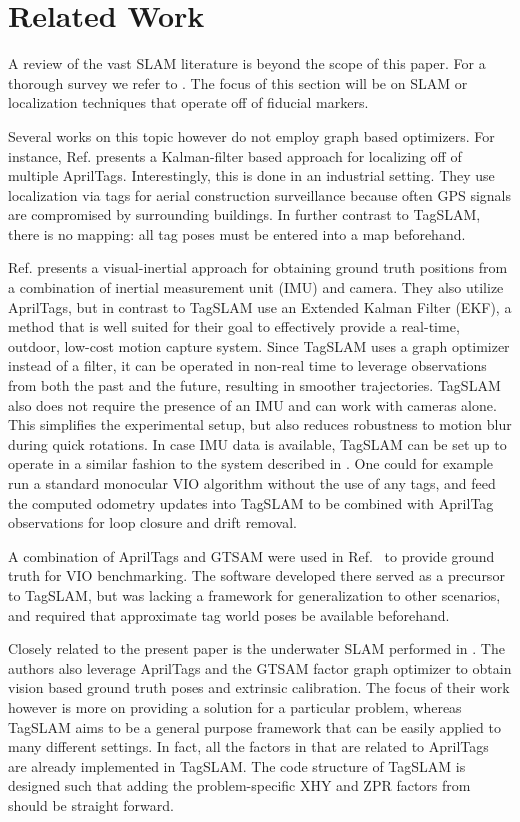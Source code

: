 \section{Related Work}
A review of the vast SLAM literature is beyond the scope of this
paper. For a thorough survey we refer to \cite{cadena2016}. The focus
of this section will be on SLAM or localization techniques that
operate off of fiducial markers.

Several works on this topic however do not employ graph based
optimizers. For instance, Ref. \cite{kayhani2019} presents a
Kalman-filter based approach for localizing off of multiple
AprilTags. Interestingly, this is done in an industrial setting. They
use localization via tags for aerial construction surveillance because
often GPS signals are compromised by surrounding buildings. In further
contrast to TagSLAM, there is no mapping: all tag poses must be
entered into a map beforehand.

Ref. \cite{neunert2016} presents a visual-inertial approach for
obtaining ground truth positions from a combination of inertial
measurement unit (IMU) and camera. They also utilize AprilTags, but in
contrast to TagSLAM use an Extended Kalman Filter (EKF), a method that
is well suited for their goal to effectively provide a real-time,
outdoor, low-cost motion capture system. Since TagSLAM uses a graph
optimizer instead of a filter, it can be operated in non-real time to
leverage observations from both the past and the future, resulting in
smoother trajectories. TagSLAM also does not require the presence of
an IMU and can work with cameras alone. This simplifies the
experimental setup, but also reduces robustness to motion blur during
quick rotations. In case IMU data is available, TagSLAM can be set up
to operate in a similar fashion to the system described in
\cite{neunert2016}. One could for example run a standard monocular VIO
algorithm without the use of any tags, and feed the computed odometry
updates into TagSLAM to be combined with AprilTag observations for
loop closure and drift removal.

A combination of AprilTags and GTSAM were used in
Ref.\ \cite{pfrommer2017} to provide ground truth for VIO
benchmarking. The software developed there served as a precursor to
TagSLAM, but was lacking a framework for generalization to other
scenarios, and required that approximate tag world poses be available
beforehand.

Closely related to the present paper is the underwater SLAM performed
in \cite{westman2018}. The authors also leverage AprilTags and the
GTSAM factor graph optimizer to obtain vision based ground truth poses
and extrinsic calibration. The focus of their work however is more on
providing a solution for a particular problem, whereas TagSLAM aims to
be a general purpose framework that can be easily applied to many
different settings. In fact, all the factors in \cite{westman2018}
that are related to AprilTags are already implemented in TagSLAM. The
code structure of TagSLAM is designed such that adding the
problem-specific XHY and ZPR factors from \cite{westman2018} should be
straight forward.

